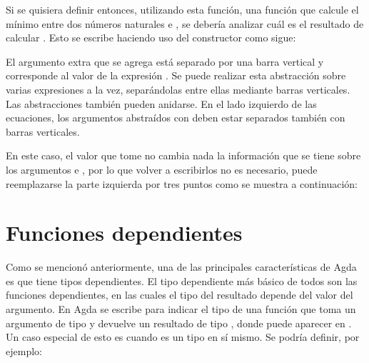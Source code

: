 
Si se quisiera definir entonces, utilizando esta función, una función  que calcule el mínimo entre dos números naturales  e , se debería analizar cuál es el resultado de calcular  \AgdaFunction{<} . Esto se escribe haciendo uso del constructor  como sigue:


El argumento extra que se agrega está separado por una barra vertical y corresponde al valor de la expresión  \AgdaFunction{<} . Se puede realizar esta abstracción sobre varias expresiones a la vez, separándolas entre ellas mediante barras verticales. Las abstracciones  también pueden anidarse. En el lado izquierdo de las ecuaciones, los argumentos abstraídos con  deben estar separados también con barras verticales. 

En este caso, el valor que tome  \AgdaFunction{<}  no cambia nada la información que se tiene sobre los argumentos  e , por lo que volver a escribirlos no es necesario, puede reemplazarse la parte izquierda por tres puntos como se muestra a continuación:


\section{Funciones dependientes}\label{agda:dependent}

Como se mencionó anteriormente, una de las principales características de Agda es que tiene tipos dependientes. El tipo dependiente más básico de todos son las funciones dependientes, en las cuales el tipo del resultado depende del valor del argumento. En Agda se escribe \AgdaSymbol{(} \AgdaSymbol{:} \AgdaSymbol{)} \AgdaSymbol{$\rightarrow$}  para indicar el tipo de una función que toma un argumento  de tipo  y devuelve un resultado de tipo , donde  puede aparecer en . Un caso especial de esto es cuando  es un tipo en sí mismo. Se podría definir, por ejemplo:


